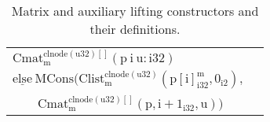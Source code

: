\begin{table}[H]
\begin{scriptsize}
\begin{center}
\begin{tabular}{|l|l|}
\hline
$\mathrm{Cmat^{clnode(u32)[]}_m(p\ i\ u:i32)}$ & \makecell[l]{\Tstrut $\mathrm{\underline{if}\ (i \geq u)}$ $\mathrm{\underline{then}\ MNil}$ \\ \Bstrut $\mathrm{\underline{else}\ MCons(Clist^{clnode(u32)}_m(p[i]^m_{i32},0_{i2}),}$ \\ \qquad\qquad\ \ \ \  $\mathrm{Cmat^{clnode(u32)[]}_m(p,i+1_{i32},u))}$} \\
\hline
\end{tabular}
\end{center}
\end{scriptsize}
\vspace{-15px}
\caption{\label{tab:LiftingConsMatrix}Matrix and auxiliary lifting constructors and their definitions.}
\end{table}
